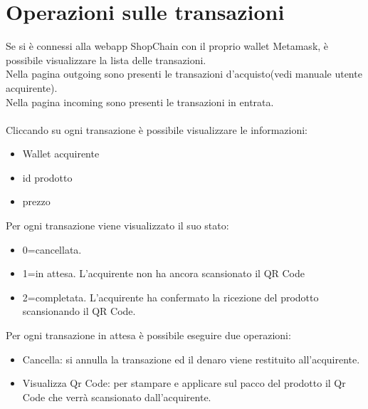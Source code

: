 \documentclass[a4paper, 12pt]{article}
\begin{document}
\section{Operazioni sulle transazioni}
Se si è connessi alla webapp ShopChain con il proprio wallet Metamask, è possibile visualizzare la lista delle transazioni.
\\Nella pagina outgoing sono presenti le transazioni d'acquisto(vedi manuale utente acquirente).
\\Nella pagina incoming sono presenti le transazioni in entrata.
\\\\Cliccando su ogni transazione è possibile visualizzare le informazioni:
\begin{itemize}
\item Wallet acquirente
\item id prodotto
\item prezzo
\end{itemize}
Per ogni transazione viene visualizzato il suo stato:
\begin{itemize}
    \item 0=cancellata.
    \item 1=in attesa. L'acquirente non ha ancora scansionato il QR Code
    \item 2=completata. L'acquirente ha confermato la ricezione del prodotto scansionando il QR Code.
\end{itemize}
Per ogni transazione in attesa è possibile eseguire due operazioni:
\begin{itemize}
    \item Cancella: si annulla la transazione ed il denaro viene restituito all'acquirente.
    \item Visualizza Qr Code: per stampare e applicare sul pacco del prodotto il Qr Code che verrà scansionato dall'acquirente.
\end{itemize}
\end{document}
